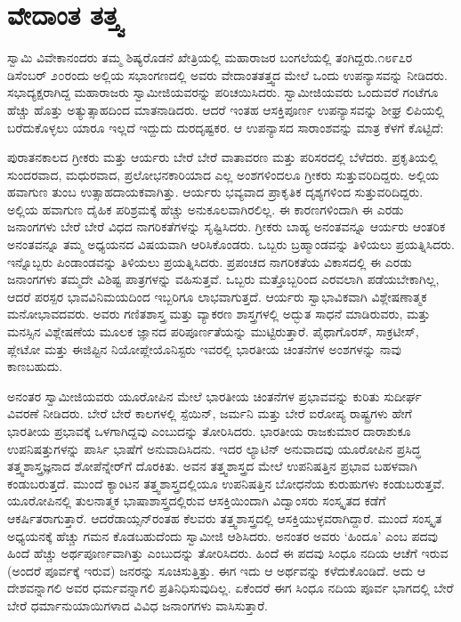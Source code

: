 
\chapter{ವೇದಾಂತ ತತ್ತ್ವ}

ಸ್ವಾಮಿ ವಿವೇಕಾನಂದರು ತಮ್ಮ ಶಿಷ್ಯರೊಡನೆ ಖೇತ್ರಿಯಲ್ಲಿ ಮಹಾರಾಜರ ಬಂಗಲೆಯಲ್ಲಿ ತಂಗಿದ್ದರು.೧೮೯೭ರ ಡಿಸೆಂಬರ್​ ೨೦ರಂದು ಅಲ್ಲಿಯ ಸಭಾಂಗಣದಲ್ಲಿ ಅವರು ವೇದಾಂತತತ್ತ್ವದ ಮೇಲೆ ಒಂದು ಉಪನ್ಯಾಸವನ್ನು ನೀಡಿದರು. ಸಭಾದ್ಯಕ್ಷರಾಗಿದ್ದ ಮಹಾರಾಜರು ಸ್ವಾಮೀಜಿಯವರನ್ನು ಪರಿಚಯಿಸಿದರು. ಸ್ವಾಮೀಜಿಯವರು ಒಂದುವರೆ ಗಂಟೆಗೂ ಹೆಚ್ಚು ಹೊತ್ತು ಅತ್ಯುತ್ಸಾಹದಿಂದ ಮಾತನಾಡಿದರು. ಆದರೆ ಇಂತಹ ಆಸಕ್ತಿಪೂರ್ಣ ಉಪನ್ಯಾಸವನ್ನು ಶೀಘ್ರ ಲಿಪಿಯಲ್ಲಿ ಬರೆದುಕೊಳ್ಳಲು ಯಾರೂ ಇಲ್ಲದೆ ಇದ್ದುದು ದುರದೃಷ್ಟಕರ. ಆ ಉಪನ್ಯಾಸದ ಸಾರಾಂಶವನ್ನು ಮಾತ್ರ ಕೆಳಗೆ ಕೊಟ್ಟಿದೆ:

ಪುರಾತನಕಾಲದ ಗ್ರೀಕರು ಮತ್ತು ಆರ್ಯರು ಬೇರೆ ಬೇರೆ ವಾತಾವರಣ ಮತ್ತು ಪರಿಸರದಲ್ಲಿ ಬೆಳೆದರು. ಪ್ರಕೃತಿಯಲ್ಲಿ ಸುಂದರವಾದ, ಮಧುರವಾದ, ಪ್ರಲೋಭನಕಾರಿಯಾದ ಎಲ್ಲ ಅಂಶಗಳಿಂದಲೂ ಗ್ರೀಕರು ಸುತ್ತುವರಿದಿದ್ದರು. ಅಲ್ಲಿಯ ಹವಾಗುಣ ತುಂಬ ಉತ್ಸಾಹದಾಯಕವಾಗಿತ್ತು. ಆರ್ಯರು ಭವ್ಯವಾದ ಪ್ರಾಕೃತಿಕ ದೃಶ್ಯಗಳಿಂದ ಸುತ್ತುವರಿದಿದ್ದರು. ಅಲ್ಲಿಯ ಹವಾಗುಣ ದೈಹಿಕ ಪರಿಶ್ರಮಕ್ಕೆ ಹೆಚ್ಚು ಅನುಕೂಲವಾಗಿರಲಿಲ್ಲ. ಈ ಕಾರಣಗಳಿಂದಾಗಿ ಈ ಎರಡು ಜನಾಂಗಗಳು ಬೇರೆ ಬೇರೆ ವಿಧದ ನಾಗರಿಕತೆಗಳನ್ನು ಸೃಷ್ಟಿಸಿದರು. ಗ್ರೀಕರು ಬಾಹ್ಯ ಅನಂತವನ್ನೂ ಆರ್ಯರು ಆಂತರಿಕ ಅನಂತವನ್ನೂ ತಮ್ಮ ಅಧ್ಯಯನದ ವಿಷಯವಾಗಿ ಆರಿಸಿಕೊಂಡರು. ಒಬ್ಬರು ಬ್ರಹ್ಮಾಂಡವನ್ನು ತಿಳಿಯಲು ಪ್ರಯತ್ನಿಸಿದರು. ಇನ್ನೊಬ್ಬರು ಪಿಂಡಾಂಡವನ್ನು ತಿಳಿಯಲು ಪ್ರಯತ್ನಿಸಿದರು. ಪ್ರಪಂಚದ ನಾಗರಿಕತೆಯ ವಿಕಾಸದಲ್ಲಿ ಈ ಎರಡು ಜನಾಂಗಗಳು ತಮ್ಮದೇ ವಿಶಿಷ್ಟ ಪಾತ್ರಗಳನ್ನು ವಹಿಸುತ್ತವೆ. ಒಬ್ಬರು ಮತ್ತೊಬ್ಬರಿಂದ ಎರವಲಾಗಿ ಪಡೆಯಬೇಕಾಗಿಲ್ಲ, ಆದರೆ ಪರಸ್ಪರ ಭಾವವಿನಿಮಯದಿಂದ ಇಬ್ಬರಿಗೂ ಲಾಭವಾಗುತ್ತದೆ. ಆರ್ಯರು ಸ್ವಾಭಾವಿಕವಾಗಿ ವಿಶ್ಲೇಷಣಾತ್ಮಕ ಮನೋಭಾವದವರು. ಅವರು ಗಣಿತಶಾಸ್ತ್ರ ಮತ್ತು ವ್ಯಾಕರಣ ಶಾಸ್ತ್ರಗಳಲ್ಲಿ ಅದ್ಭುತ ಸಾಧನೆ ಮಾಡಿರುವರು, ಮತ್ತು ಮನಸ್ಸಿನ ವಿಶ್ಲೇಷಣೆಯ ಮೂಲಕ ಜ್ಞಾನದ ಪರಿಪೂರ್ಣತೆಯನ್ನು ಮುಟ್ಟಿರುತ್ತಾರೆ. ಪೈಥಾಗೊರಸ್​, ಸಾಕ್ರಟೀಸ್​, ಪ್ಲೇಟೋ ಮತ್ತು ಈಜಿಪ್ಟಿನ ನಿಯೋಪ್ಲೇಯೊನಿಸ್ಟರು ಇವರಲ್ಲಿ ಭಾರತೀಯ ಚಿಂತನೆಗಳ ಅಂಶಗಳನ್ನು ನಾವು ಕಾಣಬಹುದು.

ಅನಂತರ ಸ್ವಾಮೀಜಿಯವರು ಯೂರೋಪಿನ ಮೇಲೆ ಭಾರತೀಯ ಚಿಂತನೆಗಳ ಪ್ರಭಾವವನ್ನು ಕುರಿತು ಸುದೀರ್ಘ ವಿವರಣೆ ನೀಡಿದರು. ಬೇರೆ ಬೇರೆ ಕಾಲಗಳಲ್ಲಿ ಸ್ಪೆಯಿನ್​, ಜರ್ಮನಿ ಮತ್ತು ಬೇರೆ ಐರೋಪ್ಯ ರಾಷ್ಟ್ರಗಳು ಹೇಗೆ ಭಾರತೀಯ ಪ್ರಭಾವಕ್ಕೆ ಒಳಗಾಗಿದ್ದವು ಎಂಬುದನ್ನು ತೋರಿಸಿದರು. ಭಾರತೀಯ ರಾಜಕುಮಾರ ದಾರಾಶುಕೂ ಉಪನಿಷತ್ತುಗಳನ್ನು ಪಾರ್ಸಿ ಭಾಷೆಗೆ ಅನುವಾದಿಸಿದನು. ಇದರ ಲ್ಯಾಟಿನ್​ ಅನುವಾದವು ಯೂರೋಪಿನ ಪ್ರಸಿದ್ಧ ತತ್ತ್ವಶಾಸ್ತ್ರಜ್ಞನಾದ ಶೋಪೆನ್ನೇರ್​ಗೆ ದೊರಕಿತು. ಅವನ ತತ್ತ್ವಶಾಸ್ತ್ರದ ಮೇಲೆ ಉಪನಿಷತ್ತಿನ ಪ್ರಭಾವ ಬಹಳವಾಗಿ ಕಂಡುಬರುತ್ತದೆ. ಮುಂದೆ ಕ್ಯಾಂಟನ ತತ್ತ್ವಶಾಸ್ತ್ರದಲ್ಲಿಯೂ ಉಪನಿಷತ್ತಿನ ಬೋಧನೆಯ ಕುರುಹುಗಳು ಕಂಡುಬರುತ್ತವೆ. ಯೂರೋಪಿನಲ್ಲಿ ತುಲನಾತ್ಮಕ ಭಾಷಾಶಾಸ್ತ್ರದಲ್ಲಿರುವ ಆಸಕ್ತಿ\-ಯಿಂದಾಗಿ ವಿದ್ವಾಂಸರು ಸಂಸ್ಕೃತದ ಕಡೆಗೆ ಆಕರ್ಷಿತರಾಗುತ್ತಾರೆ. ಆದರೆ\break ಡಾಯ್ಸನ್​ರಂತಹ ಕೆಲವರು ತತ್ತ್ವಶಾಸ್ತ್ರದಲ್ಲಿ ಆಸಕ್ತಿಯುಳ್ಳವರಾಗಿದ್ದಾರೆ. ಮುಂದೆ ಸಂಸ್ಕೃತ ಅಧ್ಯಯನಕ್ಕೆ ಹೆಚ್ಚು ಗಮನ ಕೊಡಬಹುದೆಂದು ಸ್ವಾಮೀಜಿ ಆಶಿಸಿದರು. ಅನಂತರ ಅವರು ‘ಹಿಂದೂ’ ಎಂಬ ಪದವು ಹಿಂದೆ ಹೆಚ್ಚು ಅರ್ಥಪೂರ್ಣವಾಗಿತ್ತು ಎಂಬುದನ್ನು ತೋರಿಸಿದರು. ಹಿಂದೆ ಈ ಪದವು ಸಿಂಧೂ ನದಿಯ ಆಚೆಗೆ ಇರುವ (ಅಂದರೆ ಪೂರ್ವಕ್ಕೆ ಇರುವ) ಜನರನ್ನು ಸೂಚಿಸುತ್ತಿತ್ತು. ಈಗ ಇದು ಆ ಅರ್ಥವನ್ನು ಕಳೆದುಕೊಂಡಿದೆ. ಅದು ಆ ದೇಶವನ್ನಾಗಲಿ ಅವರ ಧರ್ಮವನ್ನಾಗಲಿ ಪ್ರತಿನಿಧಿಸುವುದಿಲ್ಲ. ಏಕೆಂದರೆ ಈಗ ಸಿಂಧೂ ನದಿಯ ಪೂರ್ವ ಭಾಗದಲ್ಲಿ ಬೇರೆ ಬೇರೆ ಧರ್ಮಾನುಯಾಯಿಗಳಾದ ವಿವಿಧ ಜನಾಂಗಗಳು ವಾಸಿಸುತ್ತಾರೆ.


